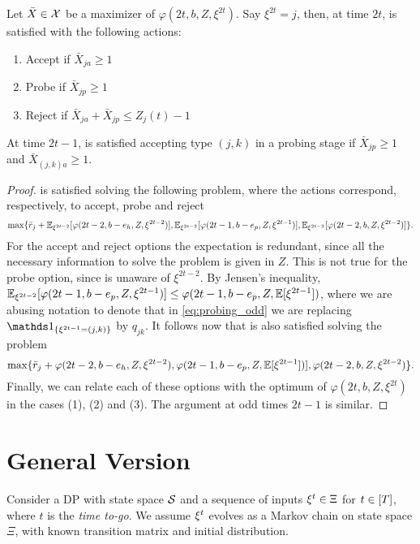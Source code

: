 \documentclass[letterpaper,11pt]{article}
\begin{document}
\begin{lemma}
Let $\bar X\in\mathcal{X}$ be a maximizer of $\varphi(2t,b,Z,\xi^{2t})$.
Say $\xi^{2t}=j$, then, at time $2t$, \off is satisfied with the following actions:
\begin{enumerate}
\item Accept if $\bar X_{ja}\geq 1$
\item Probe if $\bar X_{jp}\geq 1$
\item Reject if $\bar X_{ja}+\bar X_{jp}\leq Z_j(t)-1$
\end{enumerate}
At time $2t-1$, \off is satisfied accepting type $(j,k)$ in a probing stage if $\bar X_{jp}\geq 1$ and $\bar X_{(j,k)a}\geq 1$.
\end{lemma}
\begin{proof}
\off is satisfied solving the following problem, where the actions correspond, respectively, to accept, probe and reject
\[
\max\{\bar r_j+\mathbb{E}_{\xi^{2t-2}}[\varphi(2t-2,b-e_h,Z,\xi^{2t-2})], \mathbb{E}_{\xi^{2t-2}}[\varphi(2t-1,b-e_p,Z,\xi^{2t-1})], \mathbb{E}_{\xi^{2t-2}}[\varphi(2t-2,b,Z,\xi^{2t-2})]\}.
\]
For the accept and reject options the expectation is redundant, since all the necessary information to solve the problem is given in $Z$.
This is not true for the probe option, since \off is unaware of $\xi^{2t-2}$.
By Jensen's inequality, $\mathbb{E}_{\xi^{2t-2}}[\varphi(2t-1,b-e_p,Z,\xi^{2t-1})]\leq \varphi(2t-1,b-e_p,Z,\mathbb{E}[\xi^{2t-1}])$, where we are abusing notation to denote that in \cref{eq:probing_odd} we are replacing $\In{\xi^{2t-1}=(j,k)}$ by $q_{jk}$.
It follows now that \off is also satisfied solving the problem 
\[
\max\{\bar r_j+\varphi(2t-2,b-e_h,Z,\xi^{2t-2}), \varphi(2t-1,b-e_p,Z,\mathbb{E}[\xi^{2t-1}])], \varphi(2t-2,b,Z,\xi^{2t-2})\}.
\]
Finally, we can relate each of these options with the optimum of $\varphi(2t,b,Z,\xi^{2t})$ in the cases (1), (2) and (3).
The argument at odd times $2t-1$ is similar. 
\end{proof}


\section{General Version}

Consider a DP with state space $\mathcal{S}$ and a sequence of inputs $\xi^t\in\Xi$ for $t\in[T]$, where $t$ is the \emph{time to-go}.
We assume $\xi^t$ evolves as a Markov chain on state space $\Xi$, with known transition matrix and initial distribution.
\end{document}
